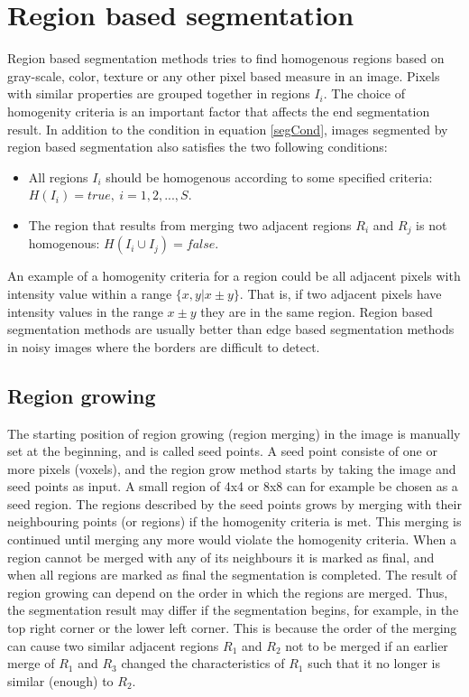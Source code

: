\section{Region based segmentation}
Region based segmentation methods tries to find homogenous regions based on gray-scale, color, texture or any other pixel based measure in an image. Pixels with similar properties are grouped together in regions \(I_i\). The choice of homogenity criteria is an important factor that affects the end segmentation result. In addition to the condition in equation \ref{segCond}, images segmented by region based segmentation also satisfies the two following conditions:
\begin{itemize}
  \item All regions \(I_i\) should be homogenous according to some specified criteria: \(H(I_i) = true, \ i=1,2,...,S.\) \label{test}
  \item The region that results from merging two adjacent regions \(R_i\) and \(R_j\) is not homogenous: \(H(I_i \cup I_j) = false. \label{test2} \) 
\end{itemize}
An example of a homogenity criteria for a region could be all adjacent pixels with intensity value within a range \(\{x,y|x \pm y\}\). That is, if two adjacent pixels have intensity values in the range \(x \pm y\) they are in the same region. Region based segmentation methods are usually better than edge based segmentation methods in noisy images where the borders are difficult to detect. 

\subsection{Region growing}
The starting position of region growing (region merging) in the image is manually set at the beginning, and is called seed points. A seed point consiste of one or more pixels (voxels), and the region grow method starts by taking the image and seed points as input. A small region of 4x4 or 8x8 can for example be chosen as a seed region. The regions described by the seed points grows by merging with their neighbouring points (or regions) if the homogenity criteria is met. This merging is continued until merging any more would violate the homogenity criteria. When a region cannot be merged with any of its neighbours it is marked as final, and when all regions are marked as final the segmentation is completed. The result of region growing can depend on the order in which the regions are merged. Thus, the segmentation result may differ if the segmentation begins, for example, in the top right corner or the lower left corner. This is because the order of the merging can cause two similar adjacent regions \(R_1\) and \(R_2\) not to be merged if an earlier merge of \(R_1\) and \(R_3\) changed the characteristics of \(R_1\) such that it no longer is similar (enough) to \(R_2\). 

